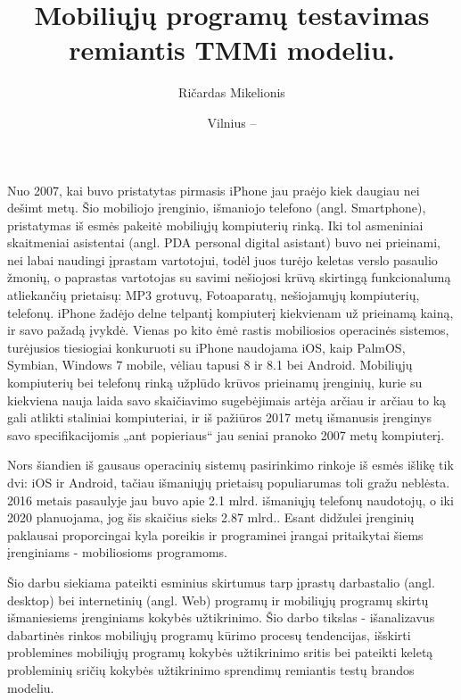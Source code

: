 \documentclass{VUMIFPSkursinis}
\title{Mobiliųjų programų testavimas remiantis TMMi modeliu.}
\author{Ričardas Mikelionis}
\date{Vilnius – \the\year}
\begin{document}
\maketitle

\cleardoublepage
{}
\tableofcontents
\cleardoublepage
{}

Nuo 2007, kai buvo pristatytas pirmasis iPhone jau praėjo kiek daugiau nei dešimt metų. Šio mobiliojo įrenginio, išmaniojo telefono (angl. Smartphone), pristatymas  iš esmės pakeitė mobiliųjų kompiuterių rinką. Iki tol asmeniniai skaitmeniai asistentai (angl. PDA personal digital asistant) buvo nei prieinami, nei labai naudingi įprastam vartotojui, todėl juos turėjo keletas verslo pasaulio žmonių, o paprastas vartotojas su savimi nešiojosi krūvą skirtingą funkcionalumą atliekančių prietaisų: MP3 grotuvų, Fotoaparatų, nešiojamųjų kompiuterių, telefonų. iPhone žadėjo delne telpantį kompiuterį kiekvienam už prieinamą kainą, ir savo pažadą įvykdė. Vienas po kito ėmė rastis  mobiliosios operacinės sistemos, turėjusios tiesiogiai konkuruoti su iPhone naudojama iOS,  kaip PalmOS, Symbian, Windows 7 mobile, vėliau tapusi 8 ir 8.1 bei Android. Mobiliųjų kompiuterių bei telefonų rinką užplūdo krūvos prieinamų įrenginių, kurie su kiekviena nauja laida savo skaičiavimo sugebėjimais artėja arčiau ir arčiau to ką gali atlikti staliniai kompiuteriai, ir iš pažiūros 2017 metų išmanusis įrenginys savo specifikacijomis „ant popieriaus“ jau seniai pranoko 2007 metų kompiuterį.

Nors šiandien iš gausaus operacinių sistemų pasirinkimo rinkoje iš esmės išlikę tik dvi: iOS ir Android, tačiau  išmaniųjų prietaisų populiarumas toli gražu neblėsta. 2016 metais pasaulyje jau buvo apie 2.1 mlrd. išmaniųjų telefonų naudotojų, o iki 2020 planuojama, jog šis skaičius sieks 2.87 mlrd.\cite {statista.com}. Esant didžulei įrenginių paklausai proporcingai kyla poreikis ir programinei įrangai pritaikytai šiems įrenginiams - mobiliosioms programoms.

Šio darbu siekiama pateikti esminius skirtumus tarp įprastų darbastalio (angl. desktop) bei internetinių (angl. Web) programų ir mobiliųjų programų skirtų išmaniesiems įrenginiams kokybės užtikrinimo. Šio darbo tikslas - išanalizavus dabartinės rinkos mobiliųjų programų kūrimo procesų tendencijas, išskirti problemines mobiliųjų programų kokybės užtikrinimo sritis bei pateikti keletą probleminių sričių kokybės užtikrinimo sprendimų remiantis testų brandos modeliu.
\end{document}
